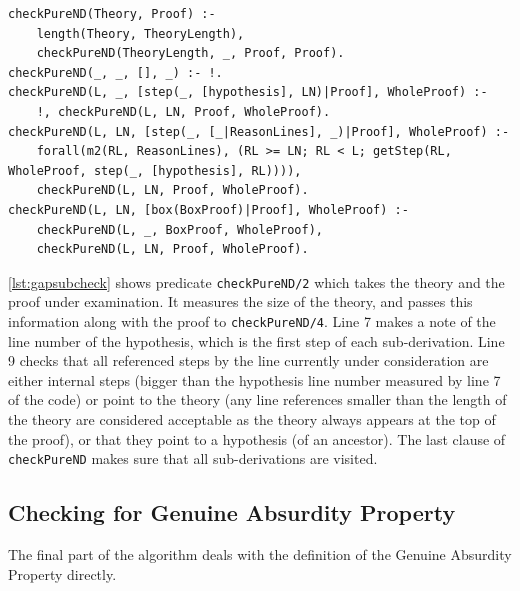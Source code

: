\documentclass[11pt,twoside,a4paper]{report}
\begin{document}
\begin{lstlisting}[caption={Checking whether a proof uses any shortcuts},label=lst:gapsubcheck]
% Checks to see if this proof does not make references to external derivations
checkPureND(Theory, Proof) :-
	length(Theory, TheoryLength),
	checkPureND(TheoryLength, _, Proof, Proof).
checkPureND(_, _, [], _) :- !.
checkPureND(L, _, [step(_, [hypothesis], LN)|Proof], WholeProof) :-
	!, checkPureND(L, LN, Proof, WholeProof).
checkPureND(L, LN, [step(_, [_|ReasonLines], _)|Proof], WholeProof) :-
	forall(m2(RL, ReasonLines), (RL >= LN; RL < L; getStep(RL, WholeProof, step(_, [hypothesis], RL)))),
	checkPureND(L, LN, Proof, WholeProof).
checkPureND(L, LN, [box(BoxProof)|Proof], WholeProof) :-
	checkPureND(L, _, BoxProof, WholeProof),
	checkPureND(L, LN, Proof, WholeProof).
\end{lstlisting}

\autoref{lst:gapsubcheck} shows predicate \lstinline$checkPureND/2$ which takes the theory and the proof under examination. It measures the size of the theory, and passes this information along with the proof to \lstinline$checkPureND/4$. Line 7 makes a note of the line number of the hypothesis, which is the first step of each sub-derivation. Line 9 checks that all referenced steps by the line currently under consideration are either internal steps (bigger than the hypothesis line number measured by line 7 of the code) or point to the theory (any line references smaller than the length of the theory are considered acceptable as the theory always appears at the top of the proof), or that they point to a hypothesis (of an ancestor). The last clause of \lstinline$checkPureND$ makes sure that all sub-derivations are visited.

\subsection{Checking for Genuine Absurdity Property}
The final part of the algorithm deals with the definition of the Genuine Absurdity Property directly.
\end{document}
